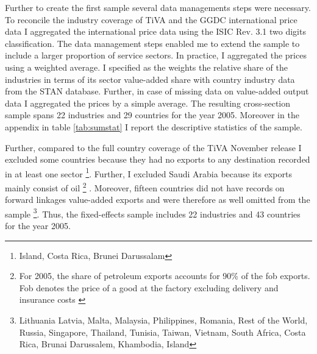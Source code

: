\par
Further to create the first sample several data managements steps were necessary. To reconcile the industry coverage of TiVA and the GGDC international price data I aggregated the international price data using the ISIC Rev. 3.1 two digits classification. The data management steps enabled me to extend the sample to include a larger proportion of service sectors. In practice, I aggregated  the prices using a weighted average. I specified as the  weights the relative share of the industries in terms of its sector value-added share with country industry data from the  \textcite{OECDSTAN} STAN database. Further, in case of missing data on value-added output data  I aggregated the prices by a simple average. The resulting cross-section sample spans 22 industries and  29 countries for the year 2005.  Moreover in the appendix in table \ref{tab:sumstat} I report the descriptive statistics of the sample.  \par 
Further, compared to the full country coverage of the TiVA November release I excluded some countries because they had no exports to any destination recorded in at least one sector \footnote{ Island, Costa Rica, Brunei Darussalam}. %
Further, I excluded Saudi Arabia because its exports mainly consist of oil \footnote{ For 2005, the share of petroleum exports accounts for  90\% of the fob exports. Fob denotes the price of a good at the factory excluding delivery and insurance costs \parencite[p.78]{combes}} \parencite{opec}. Moreover, fifteen  countries did not have records on forward linkages value-added exports and were therefore as well omitted from the sample \footnote{Lithuania Latvia, Malta, Malaysia, Philippines, Romania, Rest of the World, Russia, Singapore, Thailand, Tunisia, Taiwan, Vietnam, South Africa, Costa Rica, Brunai Darussalem, Khambodia, Island}.  Thus, the fixed-effects sample includes 22 industries and 43 countries for the year 2005.  
\endinput
